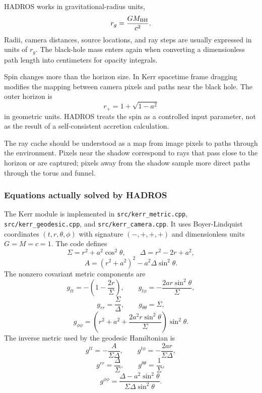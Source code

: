 \documentclass[11pt,a4paper]{article}
\begin{document}
HADROS works in gravitational-radius units,
\[
r_g=\frac{G M_{\rm BH}}{c^2}.
\]
Radii, camera distances, source locations, and ray steps are usually expressed
in units of $r_g$. The black-hole mass enters again when converting a
dimensionless path length into centimeters for opacity integrals.

Spin changes more than the horizon size. In Kerr spacetime frame dragging
modifies the mapping between camera pixels and paths near the black hole. The
outer horizon is
\[
r_+ = 1 + \sqrt{1-a^2}
\]
in geometric units. HADROS treats the spin as a controlled input parameter,
not as the result of a self-consistent accretion calculation.

The ray cache should be understood as a map from image pixels to paths through
the environment. Pixels near the shadow correspond to rays that pass close to
the horizon or are captured; pixels away from the shadow sample more direct
paths through the torus and funnel.

\subsubsection{Equations actually solved by HADROS}

The Kerr module is implemented in \texttt{src/kerr\_metric.cpp},
\texttt{src/kerr\_geodesic.cpp}, and \texttt{src/kerr\_camera.cpp}. It uses
Boyer-Lindquist coordinates $(t,r,\theta,\phi)$ with signature $(-,+,+,+)$ and
dimensionless units $G=M=c=1$. The code defines
\[
\Sigma = r^2+a^2\cos^2\theta,\qquad
\Delta = r^2-2r+a^2,
\]
\[
A=(r^2+a^2)^2-a^2\Delta\sin^2\theta.
\]
The nonzero covariant metric components are
\[
g_{tt}= -\left(1-\frac{2r}{\Sigma}\right),\qquad
g_{t\phi}= -\frac{2ar\sin^2\theta}{\Sigma},
\]
\[
g_{rr}=\frac{\Sigma}{\Delta},\qquad
g_{\theta\theta}=\Sigma,
\]
\[
g_{\phi\phi}=
\left(r^2+a^2+\frac{2a^2r\sin^2\theta}{\Sigma}\right)\sin^2\theta.
\]
The inverse metric used by the geodesic Hamiltonian is
\[
g^{tt}= -\frac{A}{\Sigma\Delta},\qquad
g^{t\phi}= -\frac{2ar}{\Sigma\Delta},
\]
\[
g^{rr}= \frac{\Delta}{\Sigma},\qquad
g^{\theta\theta}=\frac{1}{\Sigma},
\]
\[
g^{\phi\phi}=
\frac{\Delta-a^2\sin^2\theta}{\Sigma\Delta\sin^2\theta}.
\]
\end{document}
